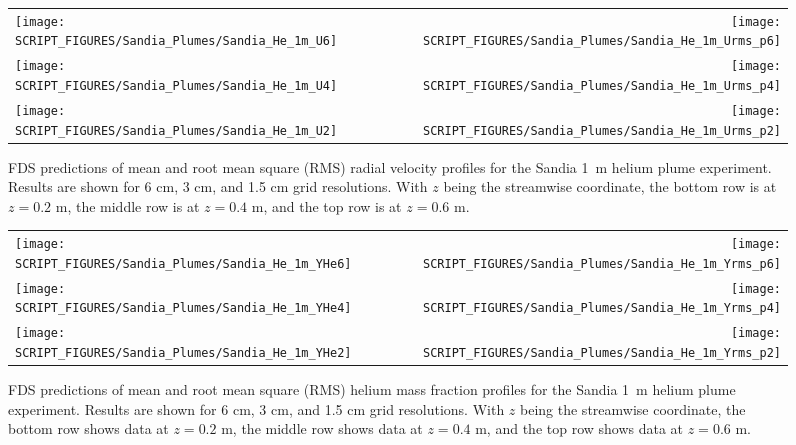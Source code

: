 \begin{figure}[p]
\begin{tabular*}{\textwidth}{l@{\extracolsep{\fill}}r}
\texttt{[image: SCRIPT\_FIGURES/Sandia\_Plumes/Sandia\_He\_1m\_U6]} &
\texttt{[image: SCRIPT\_FIGURES/Sandia\_Plumes/Sandia\_He\_1m\_Urms\_p6]} \\
\texttt{[image: SCRIPT\_FIGURES/Sandia\_Plumes/Sandia\_He\_1m\_U4]} &
\texttt{[image: SCRIPT\_FIGURES/Sandia\_Plumes/Sandia\_He\_1m\_Urms\_p4]} \\
\texttt{[image: SCRIPT\_FIGURES/Sandia\_Plumes/Sandia\_He\_1m\_U2]} &
\texttt{[image: SCRIPT\_FIGURES/Sandia\_Plumes/Sandia\_He\_1m\_Urms\_p2]}
\end{tabular*}
\caption[Sandia 1~m helium plume radial velocity profiles.]
{FDS predictions of mean and root mean square (RMS) radial velocity profiles for the Sandia 1~m helium plume experiment. Results are shown for 6 cm, 3 cm, and 1.5 cm grid resolutions. With $z$ being the streamwise coordinate, the bottom row is at $z=0.2$ m, the middle row is at $z=0.4$ m, and the top row is at $z=0.6$ m.}
\label{Sandia_He_1m_velocity_rms}
\end{figure}

\begin{figure}[p]
\begin{tabular*}{\textwidth}{l@{\extracolsep{\fill}}r}
\texttt{[image: SCRIPT\_FIGURES/Sandia\_Plumes/Sandia\_He\_1m\_YHe6]} &
\texttt{[image: SCRIPT\_FIGURES/Sandia\_Plumes/Sandia\_He\_1m\_Yrms\_p6]} \\
\texttt{[image: SCRIPT\_FIGURES/Sandia\_Plumes/Sandia\_He\_1m\_YHe4]} &
\texttt{[image: SCRIPT\_FIGURES/Sandia\_Plumes/Sandia\_He\_1m\_Yrms\_p4]} \\
\texttt{[image: SCRIPT\_FIGURES/Sandia\_Plumes/Sandia\_He\_1m\_YHe2]} &
\texttt{[image: SCRIPT\_FIGURES/Sandia\_Plumes/Sandia\_He\_1m\_Yrms\_p2]}
\end{tabular*}
\caption[Sandia 1~m helium plume mean and RMS mass fraction profiles.]
{FDS predictions of mean and root mean square (RMS) helium mass fraction profiles for the Sandia 1~m helium plume experiment. Results are shown for 6 cm, 3 cm, and 1.5 cm grid resolutions. With $z$ being the streamwise coordinate, the bottom row shows data at $z=0.2$ m, the middle row shows data at $z=0.4$ m, and the top row shows data at $z=0.6$ m.}
\label{Sandia_He_1m_massfraction}
\end{figure}

